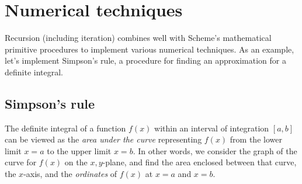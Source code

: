 \chapter{Numerical techniques}
\label{numint}

Recursion (including iteration) combines well with
Scheme’s mathematical primitive procedures to implement
various numerical techniques.  As an example,
let’s implement Simpson’s rule, a procedure for finding
an approximation for a definite integral.

\section{Simpson’s rule}

The definite integral of a function $f(x)$ within an
interval of integration $[a,b]$ can be viewed as the
{\em area under the curve} representing $f(x)$ from the
lower limit $x = a$ to the upper limit $x = b$.
In other words, we consider the graph of the curve for
$f(x)$ on the $x,y$-plane, and find the area enclosed
between that curve, the $x$-axis, and the {\em
ordinates} of $f(x)$ at $x = a$ and $x = b$.

